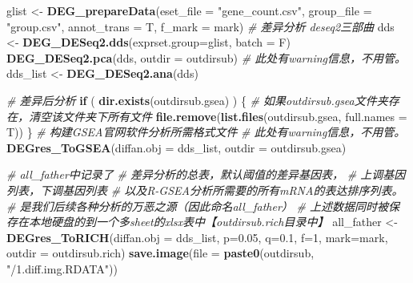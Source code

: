 \documentclass[
]{book}
\newenvironment{Shaded}{\begin{snugshade}}{\end{snugshade}}
\newcommand{\AttributeTok}[1]{\textcolor[rgb]{0.13,0.29,0.53}{#1}}
\newcommand{\CommentTok}[1]{\textcolor[rgb]{0.56,0.35,0.01}{\textit{#1}}}
\newcommand{\ControlFlowTok}[1]{\textcolor[rgb]{0.13,0.29,0.53}{\textbf{#1}}}
\newcommand{\DecValTok}[1]{\textcolor[rgb]{0.00,0.00,0.81}{#1}}
\newcommand{\FloatTok}[1]{\textcolor[rgb]{0.00,0.00,0.81}{#1}}
\newcommand{\FunctionTok}[1]{\textcolor[rgb]{0.13,0.29,0.53}{\textbf{#1}}}
\newcommand{\NormalTok}[1]{#1}
\newcommand{\OtherTok}[1]{\textcolor[rgb]{0.56,0.35,0.01}{#1}}
\newcommand{\StringTok}[1]{\textcolor[rgb]{0.31,0.60,0.02}{#1}}
\begin{document}
\begin{Shaded}
\begin{Highlighting}[]
\NormalTok{glist }\OtherTok{\textless{}{-}} \FunctionTok{DEG\_prepareData}\NormalTok{(}\AttributeTok{eset\_file =} \StringTok{"gene\_count.csv"}\NormalTok{,}
                         \AttributeTok{group\_file =} \StringTok{"group.csv"}\NormalTok{,}
                         \AttributeTok{annot\_trans =}\NormalTok{ T,}
                         \AttributeTok{f\_mark =}\NormalTok{ mark)}
\CommentTok{\# 差异分析 deseq2三部曲}
\NormalTok{dds }\OtherTok{\textless{}{-}} \FunctionTok{DEG\_DESeq2.dds}\NormalTok{(}\AttributeTok{exprset.group=}\NormalTok{glist, }\AttributeTok{batch =}\NormalTok{ F)}
\FunctionTok{DEG\_DESeq2.pca}\NormalTok{(dds, }\AttributeTok{outdir =}\NormalTok{ outdirsub) }\CommentTok{\# 此处有warning信息，不用管。}
\NormalTok{dds\_list }\OtherTok{\textless{}{-}} \FunctionTok{DEG\_DESeq2.ana}\NormalTok{(dds)}

\CommentTok{\# 差异后分析}
\ControlFlowTok{if}\NormalTok{ ( }\FunctionTok{dir.exists}\NormalTok{(outdirsub.gsea) ) \{}
  \CommentTok{\# 如果outdirsub.gsea文件夹存在，清空该文件夹下所有文件}
  \FunctionTok{file.remove}\NormalTok{(}\FunctionTok{list.files}\NormalTok{(outdirsub.gsea, }\AttributeTok{full.names =}\NormalTok{ T))}
\NormalTok{\}}
\CommentTok{\# 构建GSEA官网软件分析所需格式文件}
\CommentTok{\# 此处有warning信息，不用管。}
\FunctionTok{DEGres\_ToGSEA}\NormalTok{(}\AttributeTok{diffan.obj =}\NormalTok{ dds\_list, }\AttributeTok{outdir =}\NormalTok{ outdirsub.gsea) }

\CommentTok{\# all\_father中记录了}
\CommentTok{\#             差异分析的总表，默认阈值的差异基因表，}
\CommentTok{\#             上调基因列表，下调基因列表}
\CommentTok{\#             以及R{-}GSEA分析所需要的所有mRNA的表达排序列表。}
\CommentTok{\#   是我们后续各种分析的万恶之源（因此命名all\_father）}
\CommentTok{\#   上述数据同时被保存在本地硬盘的到一个多sheet的xlsx表中【outdirsub.rich目录中】}
\NormalTok{all\_father }\OtherTok{\textless{}{-}} \FunctionTok{DEGres\_ToRICH}\NormalTok{(}\AttributeTok{diffan.obj =}\NormalTok{ dds\_list, }\AttributeTok{p=}\FloatTok{0.05}\NormalTok{, }\AttributeTok{q=}\FloatTok{0.1}\NormalTok{, }\AttributeTok{f=}\DecValTok{1}\NormalTok{,}
                            \AttributeTok{mark=}\NormalTok{mark, }\AttributeTok{outdir =}\NormalTok{ outdirsub.rich)}
\FunctionTok{save.image}\NormalTok{(}\AttributeTok{file =} \FunctionTok{paste0}\NormalTok{(outdirsub, }\StringTok{"/1.diff.img.RDATA"}\NormalTok{))}
\end{Highlighting}
\end{Shaded}
\end{document}
